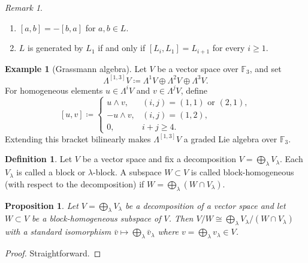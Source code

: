 \documentclass[11pt,reqno]{article}
\newtheorem{proposition}[theorem]{Proposition}
\theoremstyle{definition}
\newtheorem{definition}[theorem]{Definition}
\newtheorem{example}[theorem]{Example}
\theoremstyle{remark}
\newtheorem{remark}[theorem]{Remark}
\begin{document}
\begin{remark}
    \begin{enumerate}
        \item $[a,b]=-[b,a]$ for $a,b\in L$.
        \item $L$ is generated by $L_1$ if and only if
        $[L_i,L_1]=L_{i+1}$ for every $i\geq1$.
    \end{enumerate}
\end{remark}

\begin{example}[Grassmann algebra]\label{example:Grassmann algebra}
    Let $V$ be a vector space over $\mathbb F_3$, and set
    \[
    \Lambda^{[1,3]}V
    \coloneqq \Lambda^1V\oplus\Lambda^2V\oplus\Lambda^3V.
    \]
    For homogeneous elements $u\in\Lambda^iV$ and $v\in\Lambda^jV$, define
    \[
    [u,v]\coloneqq
    \begin{cases}
        u\wedge v,&(i,j)=(1,1)\text{ or }(2,1),\\
        -u\wedge v,&(i,j)=(1,2),\\
        0,&i+j\geq4.
    \end{cases}
    \]
    Extending this bracket bilinearly makes $\Lambda^{[1,3]}V$ a graded Lie
    algebra over $\mathbb F_3$.
\end{example}

\begin{definition}
    Let $V$ be a vector space and fix a decomposition $V=\bigoplus_\lambda V_\lambda$.
    Each $V_\lambda$ is called a block or $\lambda$-block.
    A subspace $W\subset V$ is called block-homogeneous (with respect to the decomposition) if $W=\bigoplus_\lambda (W\cap V_\lambda)$.
\end{definition}

\begin{proposition}
    Let $V=\bigoplus_\lambda V_\lambda$ be a decomposition of a vector space and let $W\subset V$ be a block-homogeneous subspace of $V$.
    Then $V/W\cong\bigoplus_\lambda V_\lambda/(W\cap V_\lambda)$ with a standard isomorphism $\bar v \mapsto \bigoplus_\lambda \bar v_\lambda$ where $v=\bigoplus_\lambda v_\lambda \in V$.
\end{proposition}
\begin{proof}
    Straightforward.
\end{proof}
\end{document}
